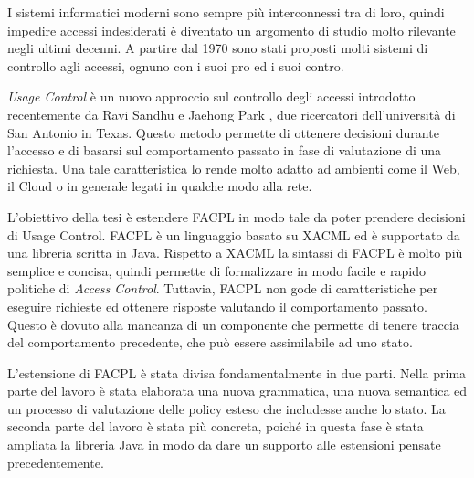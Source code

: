 I sistemi informatici moderni sono sempre più interconnessi tra di loro, quindi
impedire accessi indesiderati è diventato un argomento di studio molto rilevante negli ultimi decenni.
A partire dal 1970 sono stati proposti molti sistemi di controllo agli accessi, ognuno con i suoi pro ed i suoi contro.\par
\textit{Usage Control} è un nuovo approccio sul controllo degli accessi
introdotto recentemente da Ravi Sandhu e Jaehong Park \cite{ucon}, due ricercatori dell'università di San Antonio in Texas.
Questo metodo permette di ottenere decisioni durante
l’accesso e di basarsi sul comportamento passato in fase di valutazione
di una richiesta. Una tale caratteristica lo rende molto adatto ad ambienti come il Web,
il Cloud o in generale legati in qualche modo alla rete. \par
L'obiettivo della tesi è estendere \ac{FACPL} in modo tale da poter prendere decisioni 
di Usage Control.
\ac{FACPL} è un linguaggio basato su \ac{XACML} ed è supportato da una libreria
scritta in Java. Rispetto a \ac{XACML} la sintassi di \ac{FACPL} è molto più semplice
e concisa, quindi permette di formalizzare in modo facile e rapido
politiche di \textit{Access Control}. 
Tuttavia, \ac{FACPL} non gode di caratteristiche
per eseguire richieste ed ottenere risposte valutando il comportamento passato. Questo è dovuto alla mancanza di un componente che permette di tenere traccia del comportamento precedente, che può essere assimilabile ad uno stato.\par
L'estensione di \ac{FACPL} è stata divisa fondamentalmente in due parti. 
Nella prima parte del lavoro è stata elaborata una nuova grammatica, una nuova semantica ed un processo di valutazione delle policy esteso che includesse anche lo stato.
La seconda parte del lavoro è stata più concreta, poiché in questa fase è stata ampliata la libreria Java in modo da dare un supporto alle estensioni pensate precedentemente. \par



